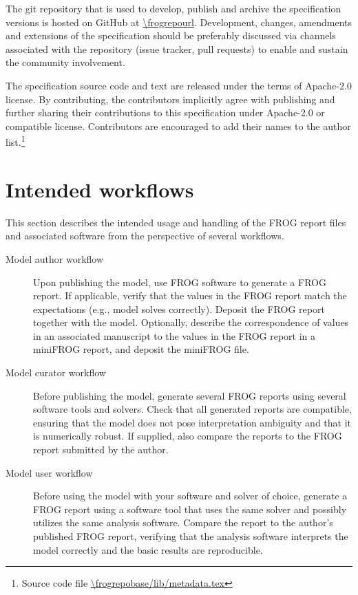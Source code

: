 The git repository that is used to develop, publish and archive the specification versions is hosted on GitHub at \url{\frogrepourl}. Development, changes, amendments and extensions of the specification should be preferably discussed via channels associated with the repository (issue tracker, pull requests) to enable and sustain the community involvement.

The specification source code and text are released under the terms of Apache-2.0 license. By contributing, the contributors implicitly agree with publishing and further sharing their contributions to this specification under Apache-2.0 or compatible license. Contributors are encouraged to add their names to the author list.\footnote{Source code file \url{\frogrepobase/lib/metadata.tex}}

\section{Intended workflows}

This section describes the intended usage and handling of the FROG report files and associated software from the perspective of several workflows.

\begin{description}
\item[Model author workflow] Upon publishing the model, use FROG software to generate a FROG report. If applicable, verify that the values in the FROG report match the expectations (e.g., model solves correctly). Deposit the FROG report together with the model. Optionally, describe the correspondence of values in an associated manuscript to the values in the FROG report in a miniFROG report, and deposit the miniFROG file.
\item[Model curator workflow] Before publishing the model, generate several FROG reports using several software tools and solvers. Check that all generated reports are compatible, ensuring that the model does not pose interpretation ambiguity and that it is numerically robust. If supplied, also compare the reports to the FROG report submitted by the author.
\item[Model user workflow] Before using the model with your software and solver of choice, generate a FROG report using a software tool that uses the same solver and possibly utilizes the same analysis software. Compare the report to the author's published FROG report, verifying that the analysis software interprets the model correctly and the basic results are reproducible.
\end{description}

